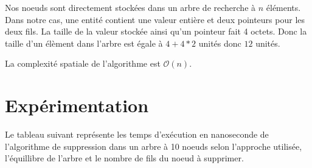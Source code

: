 \par
Nos noeuds sont directement stockées dans un arbre de recherche à $n$ éléments. Dans notre cas, une entité contient une valeur entière et deux pointeurs pour les deux fils. La taille de la valeur stockée ainsi qu'un pointeur fait 4 octets. Donc la taille d'un élèment dans l'arbre est égale à $4+ 4*2$ unités donc $12$ unités.
\par
La complexité spatiale de l’algorithme est $\mathcal{O}(n)$.
\par

\section{Expérimentation}
Le tableau suivant représente les temps d'exécution en nanoseconde de l'algorithme de suppression dans un arbre à 10 noeuds selon l'approche utilisée, l'équillibre de l'arbre et le nombre de fils du noeud à supprimer.\\ 
\small
